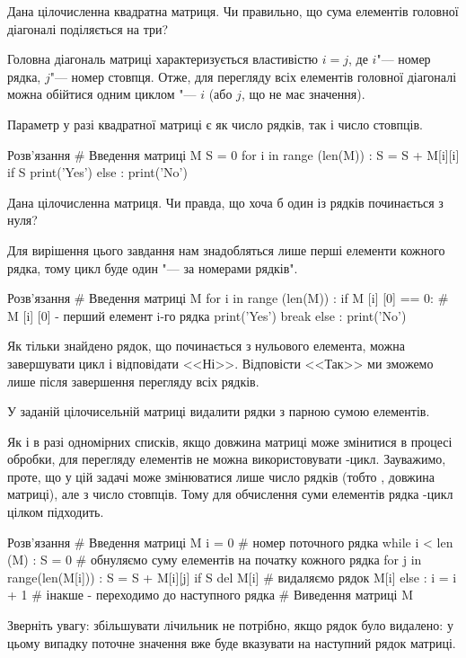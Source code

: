 \begin{pr}{}
Дана цілочисленна квадратна матриця. Чи правильно, що сума елементів головної діагоналі поділяється на три?
\end{pr}

Головна діагональ матриці характеризується властивістю $ i = j $, де $ i $"--- номер рядка, $ j $"--- номер стовпця. Отже, для перегляду всіх елементів головної діагоналі можна обійтися одним циклом "--- $ i $ (або $ j $, що не має значення).

Параметр  у разі квадратної матриці є як число рядків, так і число стовпців.

\begin{py}{Розв'язання}
# Введення матриці M
S = 0
for i in range (len(M)) :
    S = S + M[i][i]
if S %
    print('Yes')
else :
    print('No')
\end{py}

\begin{pr}{}
Дана цілочисленна матриця. Чи правда, що хоча б один із рядків починається з нуля?
\end{pr}

Для вирішення цього завдання нам знадобляться лише перші елементи кожного рядка, тому цикл буде один "--- за номерами рядків".

\begin{py}{Розв'язання}
# Введення матриці M
for i in range (len(M)) :
    if M [i] [0] == 0: # M [i] [0] - перший елемент i-го рядка
        print('Yes')
        break
    else :
        print('No')
\end{py}
\noindent Як тільки знайдено рядок, що починається з нульового елемента, можна завершувати цикл і відповідати <<Ні>>. Відповісти <<Так>> ми зможемо лише після завершення перегляду всіх рядків.

\begin{pr}{}
У заданій цілочисельній матриці видалити рядки з парною сумою елементів.
\end{pr}

Як і в разі одномірних списків, якщо довжина матриці може змінитися в процесі обробки, для перегляду елементів не можна використовувати -цикл. Зауважимо, проте, що у цій задачі може змінюватися лише число рядків (тобто , довжина матриці), але з число стовпців. Тому для обчислення суми елементів рядка -цикл цілком підходить.

\begin{py}{Розв'язання}
# Введення матриці M
i = 0 # номер поточного рядка
while i < len (M) :
    S = 0 # обнуляємо суму елементів на початку кожного рядка
    for j in range(len(M[i])) :
        S = S + M[i][j]
    if S %
        del M[i] # видаляємо рядок M[i]
    else :
        i = i + 1 # інакше - переходимо до наступного рядка
# Виведення матриці M
\end{py}
\noindent Зверніть увагу: збільшувати лічильник  не потрібно, якщо рядок було видалено: у цьому випадку поточне значення  вже буде вказувати на наступний рядок матриці.

